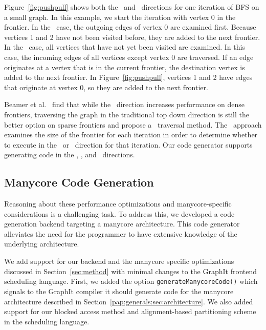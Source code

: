 Figure~\ref{fig:pushpull} shows both the \push~and \pull~directions for one iteration of BFS on a small graph.
In this example, we start the iteration with vertex 0 in the frontier. 
In the \push~case, the outgoing edges of vertex 0 are examined first.
Because vertices 1 and 2 have not been visited before, they are added to the next frontier.
In the \pull~case, all vertices that have not yet been visited are examined.
In this case, the incoming edges of all vertices except vertex 0 are traversed.
If an edge originates at a vertex that is in the current frontier, the destination vertex is added to the next frontier.
In Figure~\ref{fig:pushpull}, vertices 1 and 2 have edges that originate at vertex 0, so they are added to the next frontier. 

Beamer et al.~\cite{beamer-bfs-direction} find that while the \pull~direction increases performance on dense frontiers, traversing the graph in the traditional top down \push direction is still the better option on sparse frontiers and propose a \hybrid~traversal method.
The \hybrid~approach examines the size of the frontier for each iteration in order to determine whether to execute in the \push~or \pull~direction for that iteration.
Our code generator supports generating code in the \pull, \push, and \hybrid~directions.


\subsection{Manycore Code Generation}\label{sec:method:sub:baseline}

Reasoning about these performance optimizations and manycore-specific considerations is a challenging task.
To address this, we developed a code generation backend targeting a manycore architecture.
This code generator alleviates the need for the programmer to have extensive knowledge of the underlying architecture.

We add support for our backend and the manycore specific optimizations discussed in Section~\ref{sec:method} with minimal changes to the GraphIt frontend scheduling language.
First, we added the option \lstinline[language=graphit]{generateManycoreCode()} which signals to the GraphIt compiler it should generate code for the manycore architecture described in Section~\ref{pap:generals:sec:architecture}.
We also added support for our blocked access method and alignment-based partitioning scheme in the scheduling language. 


